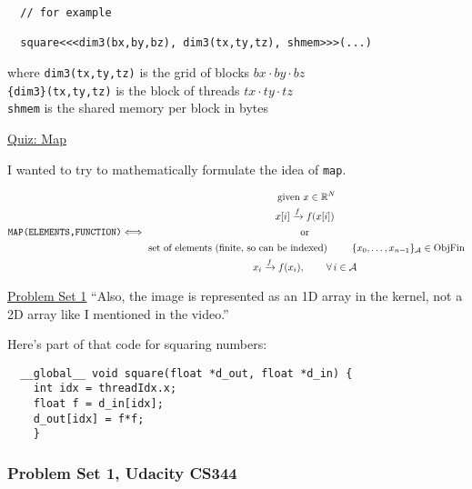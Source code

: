\documentclass[10pt]{amsart}
\begin{document}
\begin{multicols*}{2}
\begin{lstlisting}
  // for example

  square<<<dim3(bx,by,bz), dim3(tx,ty,tz), shmem>>>(...)
  \end{lstlisting}
where \verb|dim3(tx,ty,tz)| is the grid of blocks $bx\cdot by \cdot bz$ \\
\phantom{ where } \verb|{dim3}(tx,ty,tz)| is the block of threads $tx \cdot ty \cdot tz$ \\
\phantom{ where } \verb|shmem| is the shared memory per block in bytes


\href{https://classroom.udacity.com/courses/cs344/lessons/55120467/concepts/673071460923#}{Quiz: Map}

I wanted to try to mathematically formulate the idea of \verb|map|.

\[
\begin{gathered}
  \verb|MAP(ELEMENTS,FUNCTION)|
  \end{gathered} \Longleftrightarrow
\begin{gathered}
\begin{gathered}
  \text{ given } x \in \mathbb{R}^N \\ 
  x[i] \xrightarrow{ f } f(x[i]) 
\end{gathered} \\
\text{ or } \\ 
\begin{gathered}
  \text{ set of elements (finite, so can be indexed) } \qquad \, \lbrace x_0 , \dots , x_{n-1} \rbrace_{\mathcal{A}} \in \text{Obj}\mathbf{ \text{Fin} } \\
  x_i \xrightarrow{ f } f(x_i) , \qquad \, \forall \, i \in \mathcal{A}
  \end{gathered}
  \end{gathered}
\]

\href{https://classroom.udacity.com/courses/cs344/lessons/55120467/concepts/967066740923}{Problem Set 1}
``Also, the image is represented as an 1D array in the kernel, not a 2D array like I mentioned in the video.''

Here's part of that code for squaring numbers:
\begin{lstlisting}
  __global__ void square(float *d_out, float *d_in) {
    int idx = threadIdx.x;
    float f = d_in[idx];
    d_out[idx] = f*f;
    }
  \end{lstlisting}

\subsubsection{Problem Set 1, Udacity CS344}


\end{multicols*}
\end{document}
